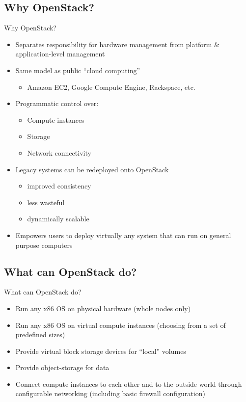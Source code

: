 \documentclass[xcolor=x11names,compress]{beamer}
\renewcommand{\(}{\begin{columns}}
\renewcommand{\)}{\end{columns}}
\newcommand{\<}[1]{\begin{column}{#1}}
\renewcommand{\>}{\end{column}}
\begin{document}
\subsection*{Why OpenStack?}
\begin{frame}{Why OpenStack?}
\cloudsbackground
\begin{itemize}
\item Separates responsibility for hardware management from platform \& application-level management
\item Same model as public ``cloud computing''
		\begin{itemize}
		\item Amazon EC2, Google Compute Engine, Rackspace, etc.
		\end{itemize}
\item Programmatic control over:
		\begin{itemize}
		\item Compute instances
		\item Storage
		\item Network connectivity
		\end{itemize}
\item Legacy systems can be redeployed onto OpenStack
	\begin{itemize}
	\item improved consistency
	\item less wasteful
	\item dynamically scalable
	\end{itemize}
\item Empowers users to deploy virtually any system that can run on general purpose computers
\end{itemize}
\end{frame}


\subsection*{What can OpenStack do?}
\begin{frame}{What can OpenStack do?}
\cloudsbackground
\begin{itemize}
\item Run any x86 OS on physical hardware (whole nodes only)
\item Run any x86 OS on virtual compute instances (choosing from a set of predefined sizes)
\item Provide virtual block storage devices for ``local'' volumes
\item Provide object-storage for data
\item Connect compute instances to each other and to the outside world through configurable networking (including basic firewall configuration)
\end{itemize}
\end{frame}
\end{document}
